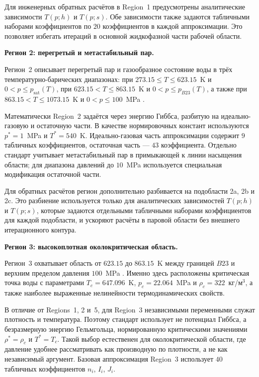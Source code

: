 Для инженерных обратных расчётов
в Region~1 предусмотрены аналитические зависимости
$T(p; h)$ и $T(p; s)$.
Обе зависимости также задаются табличными наборами коэффициентов
по $20$ коэффициентов в каждой аппроксимации.
Это позволяет избегать итераций
в основной жидкофазной части рабочей области.

\noindent\textbf{Регион 2: перегретый и метастабильный пар.}

Регион~2 описывает перегретый пар
и газообразное состояние воды
в трёх температурно-барических диапазонах:
при $273.15 \le T \le 623.15$~K и $0 < p \le p_{\mathrm{sat}}(T)$,
при $623.15 < T \le 863.15$~K и $0 < p \le p_{B23}(T)$,
а также при $863.15 < T \le 1073.15$~K и $0 < p \le 100$~MPa
\cite{iapws_if97_2012}.

Математически Region~2 задаётся через энергию Гиббса,
разбитую на идеально-газовую и остаточную части.
В качестве нормировочных констант
используются $p^{*}=1$~MPa и $T^{*}=540$~K.
Идеально-газовая часть аппроксимации
содержит $9$ табличных коэффициентов,
остаточная часть --- $43$ коэффициента.
Отдельно стандарт учитывает метастабильный пар
в примыкающей к линии насыщения области;
для диапазона давлений до $10$~MPa
используется специальная модификация остаточной части.

Для обратных расчётов
регион дополнительно разбивается на подобласти 2a, 2b и 2c.
Это разбиение используется только для аналитических зависимостей
$T(p; h)$ и $T(p; s)$,
которые задаются отдельными табличными наборами коэффициентов
для каждой подобласти,
и ускоряют расчёты в паровой области
без внешнего итерационного контура.

\noindent\textbf{Регион 3: высокоплотная околокритическая область.}

Регион~3 охватывает область
от $623.15$ до $863.15$~K
между границей $B23$ и верхним пределом давления $100$~MPa
\cite{iapws_if97_2012}.
Именно здесь расположены критическая точка воды
с параметрами $T_{c}=647.096$~K,
$p_{c}=22.064$~MPa
и $\rho_{c}=322$~кг/м$^{3}$,
а также наиболее выраженные нелинейности термодинамических свойств.

В отличие от Regions~1, 2 и~5,
для Region~3 независимыми переменными служат плотность и температура.
Поэтому стандарт использует не потенциал Гиббса,
а безразмерную энергию Гельмгольца,
нормированную критическими значениями
$\rho^{*}=\rho_{c}$ и $T^{*}=T_{c}$.
Такой выбор естественен для околокритической области,
где давление удобнее рассматривать
как производную по плотности,
а не как независимый аргумент.
Базовая аппроксимация Region~3
использует $40$ табличных коэффициентов
$n_i$, $I_i$, $J_i$.

